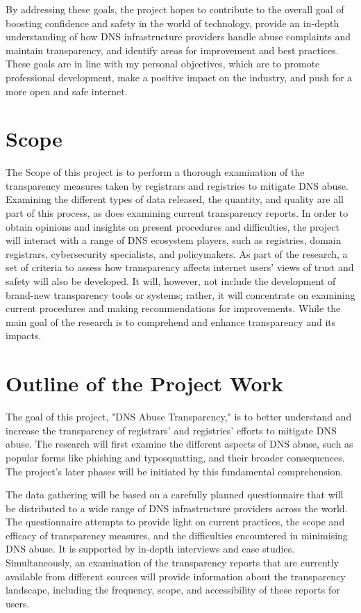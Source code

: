 By addressing these goals, the project hopes to contribute to the overall goal of boosting confidence and safety in the world of technology, provide an in-depth understanding of how DNS infrastructure providers handle abuse complaints and maintain transparency, and identify areas for improvement and best practices. These goals are in line with my personal objectives, which are to promote professional development, make a positive impact on the industry, and push for a more open and safe internet.


\section{Scope}	
The Scope of this project is to perform a thorough examination of the transparency measures taken by registrars and registries to mitigate DNS abuse. Examining the different types of data released, the quantity, and quality are all part of this process, as does examining current transparency reports. In order to obtain opinions and insights on present procedures and difficulties, the project will interact with a range of DNS ecosystem players, such as registries, domain registrars, cybersecurity specialists, and policymakers. As part of the research, a set of criteria to assess how transparency affects internet users' views of trust and safety will also be developed. It will, however, not include the development of brand-new transparency tools or systems; rather, it will concentrate on examining current procedures and making recommendations for improvements. While the main goal of the research is to comprehend and enhance transparency and its impacts. 

\section{ Outline of the Project Work} 
The goal of this project, "DNS Abuse Transparency," is to better understand and increase the transparency of registrars' and registries' efforts to mitigate DNS abuse. The research will first examine the different aspects of DNS abuse, such as popular forms like phishing and typosquatting, and their broader consequences. The project's later phases will be initiated by this fundamental comprehension.

The data gathering will be based on a carefully planned questionnaire that will be distributed to a wide range of DNS infrastructure providers across the world. The questionnaire attempts to provide light on current practices, the scope and efficacy of transparency measures, and the difficulties encountered in minimising DNS abuse. It is supported by in-depth interviews and case studies. Simultaneously, an examination of the transparency reports that are currently available from different sources will provide information about the transparency landscape, including the frequency, scope, and accessibility of these reports for users.

